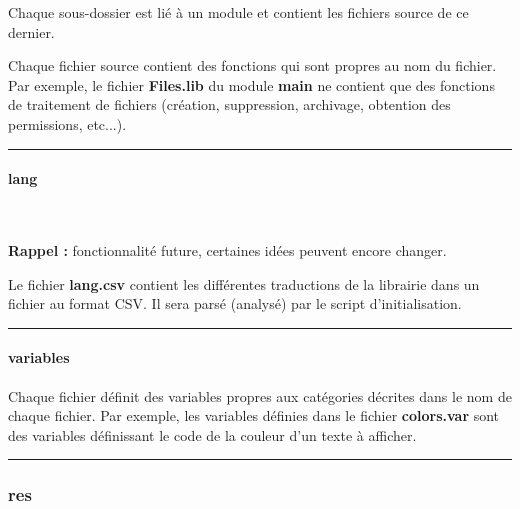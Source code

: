 \documentclass[a4paper,10pt]{article}
\begin{document}
    Chaque sous-dossier est lié à un module et contient les fichiers source de ce dernier.

    \begin{justify}
        Chaque fichier source contient des fonctions qui sont propres au nom du fichier. Par exemple, le fichier \textbf{\color{path}Files.lib} du module \textbf{main} ne contient que des fonctions de traitement de fichiers (création, suppression, archivage, obtention des permissions, etc...).
    \end{justify}


    \par\noindent\rule{\textwidth}{0.4pt}

    \paragraph{lang}\mbox{}\\\mbox{}

    \textbf{Rappel :} fonctionnalité future, certaines idées peuvent encore changer.

    \begin{justify}
        Le fichier \textbf{\color{path}lang.csv} contient les différentes traductions de la librairie dans un fichier au format CSV. Il sera parsé (analysé) par le script d'initialisation.
    \end{justify}


    \par\noindent\rule{\textwidth}{0.4pt}

    \paragraph{variables}\mbox{}

    \begin{justify}
        Chaque fichier définit des variables propres aux catégories décrites dans le nom de chaque fichier. Par exemple, les variables définies dans le fichier \textbf{\color{path}colors.var} sont des variables définissant le code de la couleur d'un texte à afficher.
    \end{justify}



    \color{sec3}\par\noindent\rule{\textwidth}{0.4pt}\color{text}

    \color{sec3}
    \subsubsection{res}\color{text}
\end{document}
